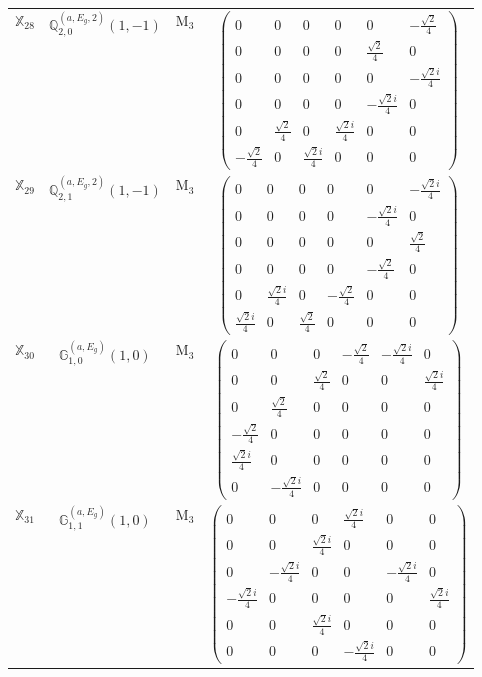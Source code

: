 \documentclass[fleqn,10pt,landscape]{article}
\begin{document}
\begin{itemize}
\begin{center}
\begin{longtable}{c|c|c|c}
$ \mathbb{X}_{28} $ & $\mathbb{Q}_{2,0}^{(a,E_{g},2)}(1,-1)$ & M$_{3}$ & $\begin{pmatrix} 0 & 0 & 0 & 0 & 0 & - \frac{\sqrt{2}}{4} \\ 0 & 0 & 0 & 0 & \frac{\sqrt{2}}{4} & 0 \\ 0 & 0 & 0 & 0 & 0 & - \frac{\sqrt{2} i}{4} \\ 0 & 0 & 0 & 0 & - \frac{\sqrt{2} i}{4} & 0 \\ 0 & \frac{\sqrt{2}}{4} & 0 & \frac{\sqrt{2} i}{4} & 0 & 0 \\ - \frac{\sqrt{2}}{4} & 0 & \frac{\sqrt{2} i}{4} & 0 & 0 & 0 \end{pmatrix}$ \\
$ \mathbb{X}_{29} $ & $\mathbb{Q}_{2,1}^{(a,E_{g},2)}(1,-1)$ & M$_{3}$ & $\begin{pmatrix} 0 & 0 & 0 & 0 & 0 & - \frac{\sqrt{2} i}{4} \\ 0 & 0 & 0 & 0 & - \frac{\sqrt{2} i}{4} & 0 \\ 0 & 0 & 0 & 0 & 0 & \frac{\sqrt{2}}{4} \\ 0 & 0 & 0 & 0 & - \frac{\sqrt{2}}{4} & 0 \\ 0 & \frac{\sqrt{2} i}{4} & 0 & - \frac{\sqrt{2}}{4} & 0 & 0 \\ \frac{\sqrt{2} i}{4} & 0 & \frac{\sqrt{2}}{4} & 0 & 0 & 0 \end{pmatrix}$ \\
$ \mathbb{X}_{30} $ & $\mathbb{G}_{1,0}^{(a,E_{g})}(1,0)$ & M$_{3}$ & $\begin{pmatrix} 0 & 0 & 0 & - \frac{\sqrt{2}}{4} & - \frac{\sqrt{2} i}{4} & 0 \\ 0 & 0 & \frac{\sqrt{2}}{4} & 0 & 0 & \frac{\sqrt{2} i}{4} \\ 0 & \frac{\sqrt{2}}{4} & 0 & 0 & 0 & 0 \\ - \frac{\sqrt{2}}{4} & 0 & 0 & 0 & 0 & 0 \\ \frac{\sqrt{2} i}{4} & 0 & 0 & 0 & 0 & 0 \\ 0 & - \frac{\sqrt{2} i}{4} & 0 & 0 & 0 & 0 \end{pmatrix}$ \\
$ \mathbb{X}_{31} $ & $\mathbb{G}_{1,1}^{(a,E_{g})}(1,0)$ & M$_{3}$ & $\begin{pmatrix} 0 & 0 & 0 & \frac{\sqrt{2} i}{4} & 0 & 0 \\ 0 & 0 & \frac{\sqrt{2} i}{4} & 0 & 0 & 0 \\ 0 & - \frac{\sqrt{2} i}{4} & 0 & 0 & - \frac{\sqrt{2} i}{4} & 0 \\ - \frac{\sqrt{2} i}{4} & 0 & 0 & 0 & 0 & \frac{\sqrt{2} i}{4} \\ 0 & 0 & \frac{\sqrt{2} i}{4} & 0 & 0 & 0 \\ 0 & 0 & 0 & - \frac{\sqrt{2} i}{4} & 0 & 0 \end{pmatrix}$ \\

\end{longtable}
\end{center}
\end{itemize}
\end{document}
